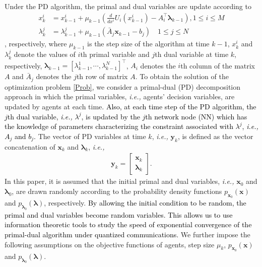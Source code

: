 \documentclass[10pt,twocolumn,twoside]{IEEEtran}
\begin{document}
 Under the PD algorithm, the primal and dual variables are update according to
\begin{align}\label{EQ: NQU}
x^{i}_{k}&=x^{i}_{k-1}+\mu_{k-1} {\left({\frac{d }{d x^i}U_i{\left({x^i_{k-1}}\right)}-A^\top_i{\ensuremath{\boldsymbol{{\lambda}}}}_{k-1}}\right)},\nonumber  1\leq i\leq M\\
\lambda^{j}_{k}&=\lambda^j_{k-1}+\mu_{k-1}{\left({\bar{A}_j{\ensuremath{\boldsymbol{{x}}}}_{k-1}-b_j}\right)}\quad 1\leq j\leq N
\end{align}
, respectively, where $\mu_{k-1}$ is the step size of the algorithm at time $k-1$, $x^i_k$ and $\lambda^j_k$ denote the values of  $i$th primal variable and $j$th dual variable at time $k$, respectively, ${\ensuremath{\boldsymbol{{\lambda}}}}_{k-1}=\left[\lambda_{k-1}^1,\cdots,\lambda_{k-1}^N\right]^\top$, $A_i$ denotes the $i$th column of the matrix $A$ and $\bar{A}_j$ denotes the $j$th row of matrix $A$. To obtain the solution of the optimization problem \eqref{Prob}, we consider a primal-dual (PD) decomposition approach in which the primal variables, \emph{i.e.,} agents' decision variables, are updated by agents at each time. \textcolor{black}{Also, at each time step of the PD algorithm,  the $j$th dual variable, \emph{i.e.,} $\lambda^j$, is updated by the $j$th network node (NN) which has the knowledge of parameters characterizing the constraint associated with $\lambda^j$, \emph{i.e.,} $A_j$ and $b_j$.}  The vector of PD variables at time $k$, \emph{i.e.,} ${\ensuremath{\boldsymbol{{y}}}}_k$, is defined as the vector concatenation of ${\ensuremath{\boldsymbol{{x}}}}_k$ and ${\ensuremath{\boldsymbol{{\lambda}}}}_k$, \emph{i.e.,}
\begin{eqnarray}
{\ensuremath{\boldsymbol{{y}}}}_k=
\left[
\begin{array}{c}
{\ensuremath{\boldsymbol{{x}}}}_k\\
{\ensuremath{\boldsymbol{{\lambda}}}}_k
\end{array}
\right].\nonumber
\end{eqnarray}
 In this paper, it is assumed that the initial primal and dual variables, \emph{i.e.,} ${\ensuremath{\boldsymbol{{x}}}}_0$ and ${\ensuremath{\boldsymbol{{\lambda}}}}_0$, are drawn randomly according to the probability density functions $p_{{\ensuremath{\boldsymbol{{x}}}}_0}{\left({{\ensuremath{\boldsymbol{{x}}}}}\right)}$ and $p_{{\ensuremath{\boldsymbol{{\lambda}}}}_0}{\left({{\ensuremath{\boldsymbol{{\lambda}}}}}\right)}$, respectively. \textcolor{black}{By allowing the initial condition to be random,  the primal and dual variables become random variables. This allows us to use information theoretic tools to study the speed of exponential convergence of the primal-dual algorithm under quantized communications.} We further impose the following assumptions on the objective functions of agents, step size $\mu_k$, $p_{{\ensuremath{\boldsymbol{{x}}}}_0}{\left({{\ensuremath{\boldsymbol{{x}}}}}\right)}$ and $p_{{\ensuremath{\boldsymbol{{\lambda}}}}_0}{\left({{\ensuremath{\boldsymbol{{\lambda}}}}}\right)}$. 
\end{document}
